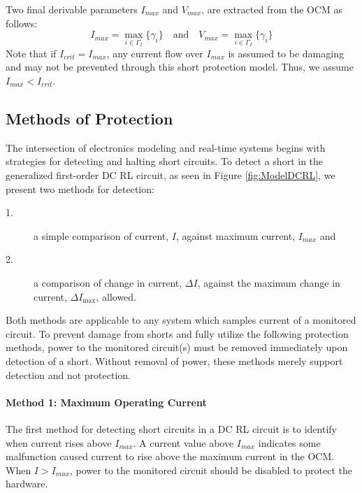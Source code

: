 Two final derivable parameters $I_{max}$ and $V_{max}$, are extracted from the OCM as follows:
\begin{equation}\label{eq:Imax}
I_{max} = \max_{i \in \Gamma_{I}} \{\gamma_i\} \quad \text{and} \quad V_{max} = \max_{i \in \Gamma_{I}} \{\gamma_i\}
\end{equation}
Note that if $I_{crit} = I_{max}$, any current flow over $I_{max}$ is assumed to be damaging and may not be prevented through this short protection model.
Thus, we assume $I_{max} < I_{crit}$.
\clearpage \subsection{Methods of Protection}\label{subsec:method of protection}
The intersection of electronics modeling and real-time systems begins with strategies for detecting and halting short circuits.
To detect a short in the generalized first-order DC RL circuit, as seen in Figure \ref{fig:ModelDCRL}, we present two methods for detection:
\begin{description}
\item [1.] a simple comparison of current, $I$, against maximum current, $I_{max}$ and
\item [2.] a comparison of change in current, $\Delta I$, against the maximum change in current, $\Delta I_{\max}$, allowed.
\end{description}
Both methods are applicable to any system which samples current of a monitored circuit.
To prevent damage from shorts and fully utilize the following protection methods, power to the monitored circuit(s) must be removed immediately upon detection of a short.
Without removal of power, these methods merely support detection and not protection.
\paragraph{Method 1: Maximum Operating Current}
The first method for detecting short circuits in a DC RL circuit is to identify when current rises above $I_{max}$.
A current value above $I_{max}$ indicates some malfunction caused current to rise above the maximum current in the OCM.
When $I > I_{max}$, power to the monitored circuit should be disabled to protect the hardware.
